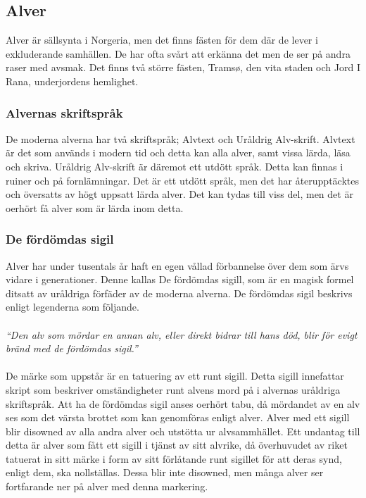 \subsection*{Alver}
Alver är sällsynta i Norgeria, men det finns fästen för dem där de lever i exkluderande samhällen. De har ofta svårt att erkänna det men de ser på andra raser med avsmak. Det finns två större fästen, Tramsø, den vita staden och Jord I Rana, underjordens hemlighet. 
%
\subsubsection*{Alvernas skriftspråk}
De moderna alverna har två skriftspråk; Alvtext och Uråldrig Alv-skrift. Alvtext är det som används i modern tid och detta kan alla alver, samt vissa lärda, läsa och skriva. Uråldrig Alv-skrift är däremot ett utdött språk. Detta kan finnas i ruiner och på fornlämningar. Det är ett utdött språk, men det har återupptäcktes och översatts av högt uppsatt lärda alver. Det kan tydas till viss del, men det är oerhört få alver som är lärda inom detta.
%
\subsubsection*{De fördömdas sigil}
Alver har under tusentals år haft en egen vållad förbannelse över dem som ärvs vidare i generationer. Denne kallas De fördömdas sigill, som är en magisk formel ditsatt av uråldriga förfäder av de moderna alverna. De fördömdas sigil beskrivs enligt legenderna som följande. \\ \\
%
\textit{``Den alv som mördar en annan alv, eller direkt bidrar till hans död, blir för evigt bränd med de fördömdas sigil.''} \\ \\ 
%
De märke som uppstår är en tatuering av ett runt sigill. Detta sigill innefattar skript som beskriver omständigheter runt alvens mord på i alvernas uråldriga skriftspråk.
%
Att ha de fördömdas sigil anses oerhört tabu, då mördandet av en alv ses som det värsta brottet som kan genomföras enligt alver. Alver med ett sigill blir disowned av alla andra alver och utstötta ur alvsammhället. 
%
Ett undantag till detta är alver som fått ett sigill i tjänst av sitt alvrike, då överhuvudet av riket tatuerat in sitt märke i form av sitt förlåtande runt sigillet för att deras synd, enligt dem, ska nollställas. Dessa blir inte disowned, men många alver ser fortfarande ner på alver med denna markering. 

